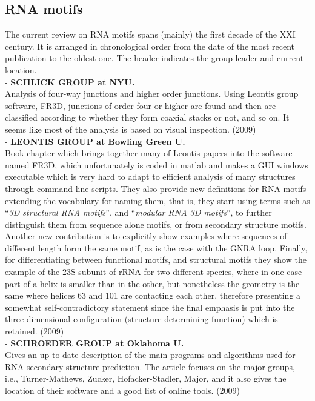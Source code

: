 \subsection{RNA motifs}
The current review on RNA motifs spans (mainly) the first decade of the
XXI century. It is arranged in chronological order from the date of the
most recent publication to the oldest one. The header indicates the group
leader and current location.\\

- \textbf{SCHLICK GROUP at NYU.}\\
Analysis of four-way junctions and higher order junctions.
Using Leontis group software, FR3D, junctions of order four or higher are found
and then are classified according to whether they form coaxial stacks
or not, and so on. It seems like most of the analysis is based on
visual inspection. (2009)
\cite{laing2009} \cite{laing2009a}\\

- \textbf{LEONTIS GROUP at Bowling Green U.}\\
Book chapter which brings together many of Leontis papers into the
software named FR3D, which unfortunately is coded in matlab and makes a
GUI windows executable which is very hard to adapt to efficient
analysis of many structures through command line scripts. They also
provide new definitions for RNA motifs extending the vocabulary for
naming them, that is, they start using terms such as ``\textit{3D structural
RNA motifs}'', and ``\textit{modular RNA 3D motifs}'', to further
distinguish them from sequence alone motifs, or from secondary structure
motifs. Another new contribution is to explicitly show examples where
sequences of different length form the same motif, as is the case with
the GNRA loop. Finally, for differentiating between functional motifs,
and structural motifs they show the example of the 23S subunit of rRNA
for two different species, where in one case part of a helix is
smaller than in the other, but nonetheless the geometry is the same
where helices 63 and 101 are contacting each other, therefore
presenting a somewhat self-contradictory statement since the final
emphasis is put into the three dimensional configuration (structure
determining function) which is retained. (2009)
\cite{nasalean2009}\\

- \textbf{SCHROEDER GROUP at Oklahoma U.}\\
Gives an up to date description of the main programs and algorithms
used for RNA secondary structure prediction. The article focuses on
the major groups, i.e., Turner-Mathews, Zucker, Hofacker-Stadler,
Major, and it also gives the location of their software and a good
list of online tools. (2009)
\cite{schroeder2009}\\

